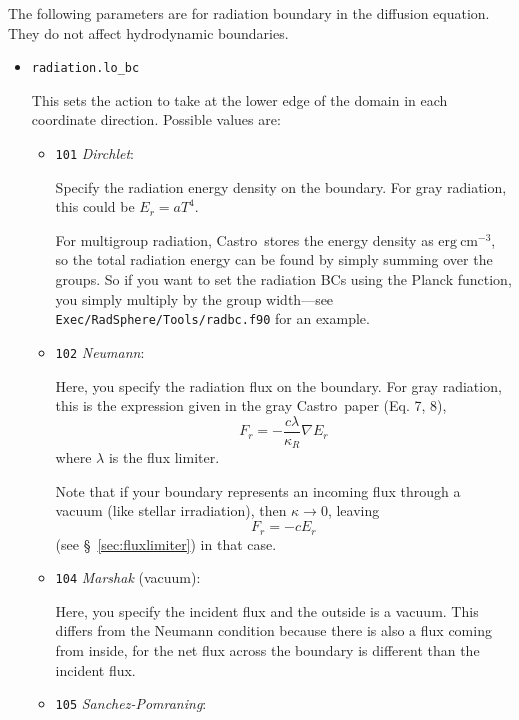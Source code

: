 \documentclass[11pt,letterpaper]{article}
\newcommand{\castro}{{\sf Castro}}
\begin{document}
The following parameters are for radiation boundary in the diffusion
equation. They do not affect hydrodynamic boundaries.
\begin{itemize}
\item {\tt radiation.lo\_bc}
  
  This sets the action to take at the lower edge of the domain in
  each coordinate direction.  Possible values are:
  \begin{itemize}

  \item {\tt 101} {\em Dirchlet}:

    Specify the radiation energy density on the boundary.
    For gray radiation, this could be $E_r = a T^4$.

    For multigroup radiation,  \castro\ stores the energy density as
    $\mathrm{erg}~\mathrm{cm}^{-3}$, so the total radiation energy
    can be found by simply summing over the groups.  So if you want
    to set the radiation BCs using the Planck function, you simply
    multiply by the group width---see {\tt Exec/RadSphere/Tools/radbc.f90}
    for an example.

  \item {\tt 102} {\em Neumann}:

    Here, you specify the radiation flux on the boundary.  For gray
    radiation, this is the expression given in the gray \castro\ paper
    (Eq. 7, 8),
    \begin{equation}
      F_r = - \frac{c\lambda}{\kappa_R} \nabla E_r
    \end{equation}
    where $\lambda$ is the flux limiter.

    Note that if your boundary represents an incoming flux through
    a vacuum (like stellar irradiation), then $\kappa \rightarrow 0$, leaving
    \begin{equation}
      F_r = -c E_r
    \end{equation}
    (see \S~\ref{sec:fluxlimiter}) in that case.  

  \item {\tt 104} {\em Marshak} (vacuum):
      
    Here, you specify the incident flux and the outside is a vacuum.
    This differs from the Neumann condition because there is also a
    flux coming from inside, for the net flux across the boundary is
    different than the incident flux.

  \item {\tt 105} {\em Sanchez-Pomraning}:


\end{itemize}
\end{itemize}
\end{document}
